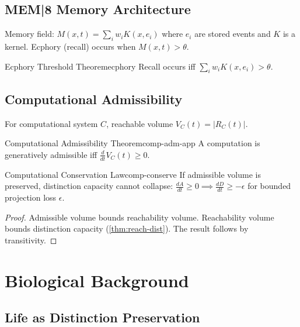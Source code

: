 \documentclass[12pt,twoside,openright]{book}
\begin{document}
\section{MEM|8 Memory Architecture}

Memory field: $M(x,t) = \sum_i w_i K(x, e_i)$
where $e_i$ are stored events and $K$ is a kernel.
Ecphory (recall) occurs when $M(x,t) > \theta$.

\begin{theorem}{Ecphory Threshold Theorem}{ecphory}
  Recall occurs iff $\sum_i w_i K(x, e_i) > \theta$.
\end{theorem}

\section{Computational Admissibility}

For computational system $C$, reachable volume
$V_C(t) = |R_C(t)|$.

\begin{theorem}{Computational Admissibility Theorem}{comp-adm-app}
  A computation is generatively admissible iff
  $\frac{d}{dt}V_C(t) \ge 0$.
\end{theorem}

\begin{theorem}{Computational Conservation Law}{comp-conserve}
  If admissible volume is preserved, distinction capacity
  cannot collapse:
  $\frac{dA}{dt} \ge 0 \implies \frac{dD}{dt} \ge -\epsilon$
  for bounded projection loss $\epsilon$.
\end{theorem}

\begin{proof}
  Admissible volume bounds reachability volume.
  Reachability volume bounds distinction capacity
  (\cref{thm:reach-dist}).
  The result follows by transitivity.
\end{proof}

\chapter{Biological Background}
\label{app:bio}

\section{Life as Distinction Preservation}
\end{document}
